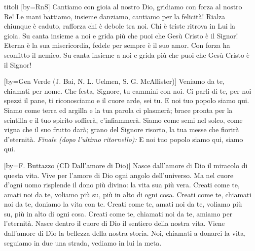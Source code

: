 \begin{songs}{titoli}
[by={RnS}]
\beginchorus
Cantiamo con gioia al nostro Dio,
gridiamo con forza al nostro Re!
Le mani battiamo, insieme danziamo, cantiamo per la felicità!
\endchorus
\beginverse
Rialza chiunque è caduto, rafforza chi è debole tra noi.
Chi è triste ritrova in Lui la gioia.
Su canta insieme a noi e grida più che puoi
che Gesù Cristo è il Signor!
\endverse
\beginverse
Eterna è la sua misericordia, fedele per sempre è il suo amor.
Con forza ha sconfitto il nemico.
Su canta insieme a noi e grida più che puoi
che Gesù Cristo è il Signor!
\endverse
\endsong

[by={Gen Verde (J. Bai, N. L. Uelmen, S. G. McAllister)}]
\beginchorus
Veniamo da te,
chiamati per nome.
Che festa, Signore, tu cammini con noi.
Ci parli di te,
per noi spezzi il pane,
ti riconosciamo e il cuore arde, sei tu.
E noi tuo popolo
siamo qui.
\endchorus
\beginverse
Siamo come terra ed argilla
e la tua parola ci plasmerà;
brace pronta per la scintilla
e il tuo spirito soffierà,
c'infiammerà.
\endverse
\beginverse
Siamo come semi nel solco,
come vigna che il suo frutto darà;
grano del Signore risorto,
la tua messe che fiorirà d'eternità.
\endverse
\beginverse*
\textit{Finale (dopo l'ultimo ritornello):}
E noi tuo popolo
siamo qui, siamo qui.
\endverse
\endsong

[by={F. Buttazzo (CD Dall'amore di Dio)}]
\beginverse
Nasce dall'amore di Dio il miracolo di questa vita.
Vive per l'amore di Dio ogni angolo dell'universo.
Ma nel cuore d'ogni uomo risplende
il dono più divino: la vita sua più vera.
\endverse
\beginchorus
Creati come te, amati noi da te,
voliamo più su, più in alto di ogni cosa.
Creati come te, chiamati noi da te,
doniamo la vita con te.
Creati come te, amati noi da te,
voliamo più su, più in alto di ogni cosa.
Creati come te, chiamati noi da te,
amiamo per l'eternità.
\endchorus
\beginverse
Nasce dentro il cuore di Dio il sentiero della nostra vita.
Viene dall'amore di Dio la bellezza della nostra storia.
Noi, chiamati a donarci la vita,
seguiamo in due una strada, vediamo in lui la meta.
\endverse
\endsong


\end{songs}
